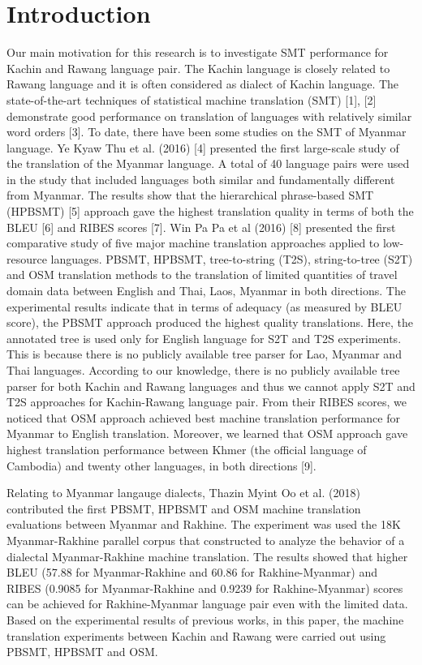\documentclass[conference]{IEEEtran}
\begin{document}
\section{Introduction}
Our main motivation for this research is to investigate SMT performance for Kachin and Rawang language pair. The Kachin language is closely related to Rawang language and it is often considered as dialect of Kachin language. The state-of-the-art techniques of statistical machine translation (SMT) [1], [2] demonstrate good performance on translation of languages with relatively similar word orders [3]. 
To date, there have been some studies on the SMT of Myanmar language. Ye Kyaw Thu et al. (2016) [4] presented the first large-scale study of the translation of the Myanmar language. A total of 40 language pairs were used in the study that included languages both similar and fundamentally different from Myanmar. The results show that the hierarchical phrase-based SMT (HPBSMT) [5] approach gave the highest translation quality in terms of both the BLEU [6] and RIBES scores [7].  Win Pa Pa et al (2016) [8] presented the first comparative study of five major machine translation approaches applied to low-resource languages. PBSMT, HPBSMT, tree-to-string (T2S), string-to-tree (S2T) and OSM translation methods to the translation of limited quantities of travel domain data between English and {Thai, Laos, Myanmar} in both directions. The experimental results indicate that in terms of adequacy (as measured by BLEU score), the PBSMT approach produced the highest quality translations. Here, the annotated tree is used only for English language for S2T and T2S experiments. This is because there is no publicly available tree parser for Lao, Myanmar and Thai languages. According to our knowledge, there is no publicly available tree parser for both Kachin and Rawang languages and thus we cannot apply S2T and T2S approaches for Kachin-Rawang language pair. From their RIBES scores, we noticed that OSM approach achieved best machine translation performance for Myanmar to English translation. Moreover, we learned that OSM approach gave highest translation performance between Khmer (the official language of Cambodia) and twenty other languages, in both directions [9].

Relating to Myanmar langauge dialects, Thazin Myint Oo  et al. (2018) \cite{b25} contributed the first PBSMT, HPBSMT and OSM machine translation evaluations between Myanmar and Rakhine. The experiment was used the 18K Myanmar-Rakhine parallel corpus that constructed to analyze the behavior of a dialectal Myanmar-Rakhine machine translation. The results showed that higher BLEU (57.88  for Myanmar-Rakhine and 60.86 for Rakhine-Myanmar) and RIBES (0.9085 for Myanmar-Rakhine and 0.9239 for Rakhine-Myanmar) scores can be achieved for Rakhine-Myanmar language pair even with the limited data. Based on the experimental results of previous works, in this paper, the machine translation experiments between Kachin and Rawang were carried out using PBSMT, HPBSMT and OSM.
\end{document}
